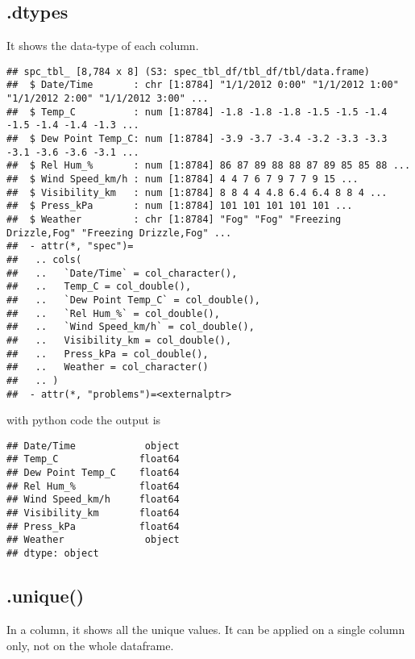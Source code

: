 \documentclass[
]{article}
\begin{document}
\hypertarget{dtypes}{%
\subsection{.dtypes}\label{dtypes}}

It shows the data-type of each column.

\begin{verbatim}
## spc_tbl_ [8,784 x 8] (S3: spec_tbl_df/tbl_df/tbl/data.frame)
##  $ Date/Time       : chr [1:8784] "1/1/2012 0:00" "1/1/2012 1:00" "1/1/2012 2:00" "1/1/2012 3:00" ...
##  $ Temp_C          : num [1:8784] -1.8 -1.8 -1.8 -1.5 -1.5 -1.4 -1.5 -1.4 -1.4 -1.3 ...
##  $ Dew Point Temp_C: num [1:8784] -3.9 -3.7 -3.4 -3.2 -3.3 -3.3 -3.1 -3.6 -3.6 -3.1 ...
##  $ Rel Hum_%       : num [1:8784] 86 87 89 88 88 87 89 85 85 88 ...
##  $ Wind Speed_km/h : num [1:8784] 4 4 7 6 7 9 7 7 9 15 ...
##  $ Visibility_km   : num [1:8784] 8 8 4 4 4.8 6.4 6.4 8 8 4 ...
##  $ Press_kPa       : num [1:8784] 101 101 101 101 101 ...
##  $ Weather         : chr [1:8784] "Fog" "Fog" "Freezing Drizzle,Fog" "Freezing Drizzle,Fog" ...
##  - attr(*, "spec")=
##   .. cols(
##   ..   `Date/Time` = col_character(),
##   ..   Temp_C = col_double(),
##   ..   `Dew Point Temp_C` = col_double(),
##   ..   `Rel Hum_%` = col_double(),
##   ..   `Wind Speed_km/h` = col_double(),
##   ..   Visibility_km = col_double(),
##   ..   Press_kPa = col_double(),
##   ..   Weather = col_character()
##   .. )
##  - attr(*, "problems")=<externalptr>
\end{verbatim}

with python code the output is

\begin{verbatim}
## Date/Time            object
## Temp_C              float64
## Dew Point Temp_C    float64
## Rel Hum_%           float64
## Wind Speed_km/h     float64
## Visibility_km       float64
## Press_kPa           float64
## Weather              object
## dtype: object
\end{verbatim}

\hypertarget{unique}{%
\subsection{.unique()}\label{unique}}

In a column, it shows all the unique values. It can be applied on a
single column only, not on the whole dataframe.
\end{document}
